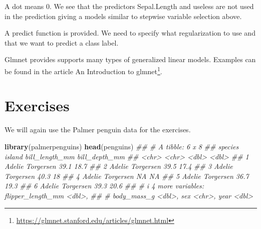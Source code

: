 \documentclass[
  notitlepage]{book}
\newenvironment{Shaded}{\begin{snugshade}}{\end{snugshade}}
\newcommand{\CommentTok}[1]{\textcolor[rgb]{0.56,0.35,0.01}{\textit{#1}}}
\newcommand{\DataTypeTok}[1]{\textcolor[rgb]{0.13,0.29,0.53}{#1}}
\newcommand{\DecValTok}[1]{\textcolor[rgb]{0.00,0.00,0.81}{#1}}
\newcommand{\FloatTok}[1]{\textcolor[rgb]{0.00,0.00,0.81}{#1}}
\newcommand{\KeywordTok}[1]{\textcolor[rgb]{0.13,0.29,0.53}{\textbf{#1}}}
\newcommand{\NormalTok}[1]{#1}
\newcommand{\OperatorTok}[1]{\textcolor[rgb]{0.81,0.36,0.00}{\textbf{#1}}}
\newcommand{\StringTok}[1]{\textcolor[rgb]{0.31,0.60,0.02}{#1}}
\DeclareRobustCommand{\href}[2]{#2\footnote{\url{#1}}}
\begin{document}
A dot means 0. We see that the predictors Sepal.Length and
useless are not used in the prediction giving a models similar to
stepwise variable selection above.

A predict function is provided. We need to specify
what regularization to use and that we want to predict a class
label.

\begin{Shaded}
\end{Shaded}

Glmnet provides supports many types of
generalized linear models. Examples can be found in the
article \href{https://glmnet.stanford.edu/articles/glmnet.html}{An Introduction to glmnet}.

\hypertarget{exercises-6}{%
\section{Exercises}\label{exercises-6}}

We will again use the Palmer penguin data for the exercises.

\begin{Shaded}
\begin{Highlighting}[]
\KeywordTok{library}\NormalTok{(palmerpenguins)}
\KeywordTok{head}\NormalTok{(penguins)}
\CommentTok{\#\# \# A tibble: 6 x 8}
\CommentTok{\#\#   species island    bill\_length\_mm bill\_depth\_mm}
\CommentTok{\#\#   \textless{}chr\textgreater{}   \textless{}chr\textgreater{}              \textless{}dbl\textgreater{}         \textless{}dbl\textgreater{}}
\CommentTok{\#\# 1 Adelie  Torgersen           39.1          18.7}
\CommentTok{\#\# 2 Adelie  Torgersen           39.5          17.4}
\CommentTok{\#\# 3 Adelie  Torgersen           40.3          18  }
\CommentTok{\#\# 4 Adelie  Torgersen           NA            NA  }
\CommentTok{\#\# 5 Adelie  Torgersen           36.7          19.3}
\CommentTok{\#\# 6 Adelie  Torgersen           39.3          20.6}
\CommentTok{\#\# \# i 4 more variables: flipper\_length\_mm \textless{}dbl\textgreater{},}
\CommentTok{\#\# \#   body\_mass\_g \textless{}dbl\textgreater{}, sex \textless{}chr\textgreater{}, year \textless{}dbl\textgreater{}}
\end{Highlighting}
\end{Shaded}
\end{document}

